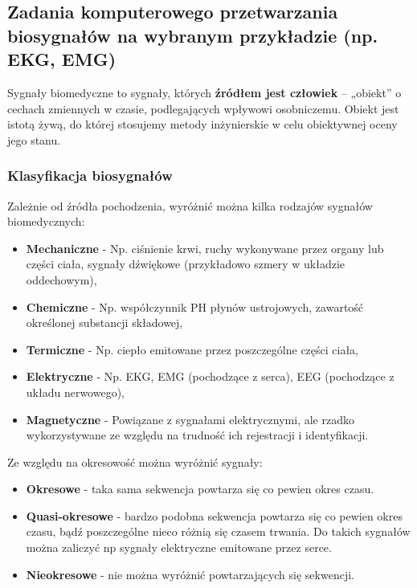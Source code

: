 \subsection{Zadania komputerowego przetwarzania biosygnałów na wybranym przykładzie (np. EKG, EMG)}

Sygnały biomedyczne to sygnały, których \textbf{źródłem jest człowiek} – „obiekt” o cechach zmiennych w czasie, podlegających wpływowi osobniczemu. Obiekt jest istotą żywą, do której stosujemy metody inżynierskie w celu obiektywnej oceny jego stanu.


\subsubsection{Klasyfikacja biosygnałów}

Zależnie od źródła pochodzenia, wyróżnić można kilka rodzajów sygnałów biomedycznych:

\begin{itemize}
	\item \textbf{Mechaniczne} - Np. ciśnienie krwi, ruchy wykonywane przez organy lub części ciała, sygnały dźwiękowe (przykładowo szmery w układzie oddechowym),
	\item \textbf{Chemiczne} - Np. współczynnik PH płynów ustrojowych, zawartość określonej substancji składowej,
	\item \textbf{Termiczne} - Np. ciepło emitowane przez poszczególne części ciała,
	\item \textbf{Elektryczne} - Np. EKG, EMG (pochodzące z serca), EEG (pochodzące z układu nerwowego),
	\item \textbf{Magnetyczne} - Powiązane z sygnałami elektrycznymi, ale rzadko wykorzystywane ze względu na trudność ich rejestracji i identyfikacji. \\
\end{itemize}

Ze względu na okresowość można wyróżnić sygnały:
\begin{itemize}
	\item \textbf{Okresowe} - taka sama sekwencja powtarza się co pewien okres czasu.
	\item \textbf{Quasi-okresowe} - bardzo podobna sekwencja powtarza się co pewien okres czasu, bądź poszczególne nieco różnią się czasem trwania. Do takich sygnałów można zaliczyć np sygnały elektryczne emitowane przez serce.
	\item \textbf{Nieokresowe} - nie można wyróżnić powtarzających się sekwencji.
\\
\end{itemize}

